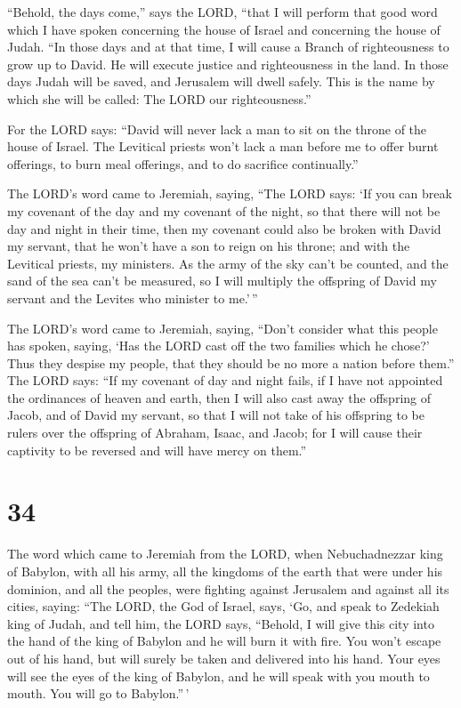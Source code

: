  ``Behold, the days come,'' says the LORD, ``that I will
perform that good word which I have spoken concerning the house of
Israel and concerning the house of Judah.  ``In those
days and at that time, I will cause a Branch of righteousness to grow up
to David. He will execute justice and righteousness in the land.
 In those days Judah will be saved, and Jerusalem will
dwell safely. This is the name by which she will be called: The LORD our
righteousness.''

 For the LORD says: ``David will never lack a man to sit
on the throne of the house of Israel.  The Levitical
priests won't lack a man before me to offer burnt offerings, to burn
meal offerings, and to do sacrifice continually.''

 The LORD's word came to Jeremiah, saying,
 ``The LORD says: `If you can break my covenant of the
day and my covenant of the night, so that there will not be day and
night in their time,  then my covenant could also be
broken with David my servant, that he won't have a son to reign on his
throne; and with the Levitical priests, my ministers.  As
the army of the sky can't be counted, and the sand of the sea can't be
measured, so I will multiply the offspring of David my servant and the
Levites who minister to me.'\,''

 The LORD's word came to Jeremiah, saying,
 ``Don't consider what this people has spoken, saying,
`Has the LORD cast off the two families which he chose?' Thus they
despise my people, that they should be no more a nation before them.''
 The LORD says: ``If my covenant of day and night fails,
if I have not appointed the ordinances of heaven and earth,
 then I will also cast away the offspring of Jacob, and
of David my servant, so that I will not take of his offspring to be
rulers over the offspring of Abraham, Isaac, and Jacob; for I will cause
their captivity to be reversed and will have mercy on them.''

\hypertarget{section-33}{%
\section{34}\label{section-33}}

 The word which came to Jeremiah from the LORD, when
Nebuchadnezzar king of Babylon, with all his army, all the kingdoms of
the earth that were under his dominion, and all the peoples, were
fighting against Jerusalem and against all its cities, saying:
 ``The LORD, the God of Israel, says, `Go, and speak to
Zedekiah king of Judah, and tell him, the LORD says, ``Behold, I will
give this city into the hand of the king of Babylon and he will burn it
with fire.  You won't escape out of his hand, but will
surely be taken and delivered into his hand. Your eyes will see the eyes
of the king of Babylon, and he will speak with you mouth to mouth. You
will go to Babylon.''\,'

